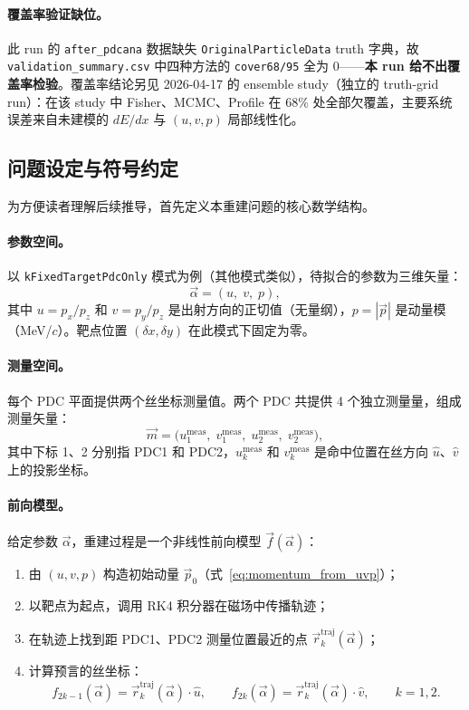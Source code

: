 \documentclass[a4paper, 11pt]{article}
\begin{document}
\paragraph{覆盖率验证缺位。}
此 run 的 \texttt{after\_pdcana} 数据缺失 \texttt{OriginalParticleData} truth 字典，故 \texttt{validation\_summary.csv} 中四种方法的 \texttt{cover68/95} 全为 0——\textbf{本 run 给不出覆盖率检验}。覆盖率结论另见 2026-04-17 的 ensemble study（独立的 truth-grid run）：在该 study 中 Fisher、MCMC、Profile 在 68\% 处全部欠覆盖，主要系统误差来自未建模的 $dE/dx$ 与 $(u,v,p)$ 局部线性化。

\subsection{问题设定与符号约定}

为方便读者理解后续推导，首先定义本重建问题的核心数学结构。

\paragraph{参数空间。}
以 \texttt{kFixedTargetPdcOnly} 模式为例（其他模式类似），待拟合的参数为三维矢量：
\begin{equation}
  \vec{\alpha} = (u,\; v,\; p),
  \label{eq:param_vec}
\end{equation}
其中 $u = p_x/p_z$ 和 $v = p_y/p_z$ 是出射方向的正切值（无量纲），$p = |\vec{p}|$ 是动量模（MeV/$c$）。靶点位置 $(\delta x, \delta y)$ 在此模式下固定为零。

\paragraph{测量空间。}
每个 PDC 平面提供两个丝坐标测量值。两个 PDC 共提供 4 个独立测量量，组成测量矢量：
\begin{equation}
  \vec{m} = \bigl(u_1^\mathrm{meas},\; v_1^\mathrm{meas},\; u_2^\mathrm{meas},\; v_2^\mathrm{meas}\bigr),
  \label{eq:meas_vec}
\end{equation}
其中下标 1、2 分别指 PDC1 和 PDC2，$u_k^\mathrm{meas}$ 和 $v_k^\mathrm{meas}$ 是命中位置在丝方向 $\hat{u}$、$\hat{v}$ 上的投影坐标。

\paragraph{前向模型。}
给定参数 $\vec{\alpha}$，重建过程是一个非线性前向模型 $\vec{f}(\vec{\alpha})$：
\begin{enumerate}[nosep]
  \item 由 $(u, v, p)$ 构造初始动量 $\vec{p}_0$（式~\eqref{eq:momentum_from_uvp}）；
  \item 以靶点为起点，调用 RK4 积分器在磁场中传播轨迹；
  \item 在轨迹上找到距 PDC1、PDC2 测量位置最近的点 $\vec{r}_k^\mathrm{traj}(\vec{\alpha})$；
  \item 计算预言的丝坐标：
  \begin{equation}
    f_{2k-1}(\vec{\alpha}) = \vec{r}_k^\mathrm{traj}(\vec{\alpha}) \cdot \hat{u}, \qquad
    f_{2k}(\vec{\alpha}) = \vec{r}_k^\mathrm{traj}(\vec{\alpha}) \cdot \hat{v}, \qquad k=1,2.
  \end{equation}
\end{enumerate}
\end{document}
